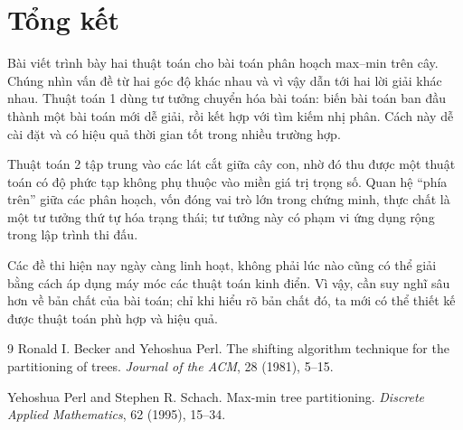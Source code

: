 \documentclass[11pt]{article}
\begin{document}
\section{Tổng kết}

Bài viết trình bày hai thuật toán cho bài toán phân hoạch max--min trên cây.
Chúng nhìn vấn đề từ hai góc độ khác nhau và vì vậy dẫn tới hai lời giải khác
nhau. Thuật toán 1 dùng tư tưởng chuyển hóa bài toán: biến bài toán ban đầu
thành một bài toán mới dễ giải, rồi kết hợp với tìm kiếm nhị phân. Cách này
dễ cài đặt và có hiệu quả thời gian tốt trong nhiều trường hợp.

Thuật toán 2 tập trung vào các lát cắt giữa cây con, nhờ đó thu được một thuật
toán có độ phức tạp không phụ thuộc vào miền giá trị trọng số. Quan hệ ``phía
trên'' giữa các phân hoạch, vốn đóng vai trò lớn trong chứng minh, thực chất
là một tư tưởng thứ tự hóa trạng thái; tư tưởng này có phạm vi ứng dụng rộng
trong lập trình thi đấu.

Các đề thi hiện nay ngày càng linh hoạt, không phải lúc nào cũng có thể giải
bằng cách áp dụng máy móc các thuật toán kinh điển. Vì vậy, cần suy nghĩ sâu
hơn về bản chất của bài toán; chỉ khi hiểu rõ bản chất đó, ta mới có thể thiết
kế được thuật toán phù hợp và hiệu quả.

\begin{thebibliography}{9}
Ronald I. Becker and Yehoshua Perl.
\newblock The shifting algorithm technique for the partitioning of trees.
\newblock \emph{Journal of the ACM}, 28 (1981), 5--15.

Yehoshua Perl and Stephen R. Schach.
\newblock Max-min tree partitioning.
\newblock \emph{Discrete Applied Mathematics}, 62 (1995), 15--34.
\end{thebibliography}
\end{document}
